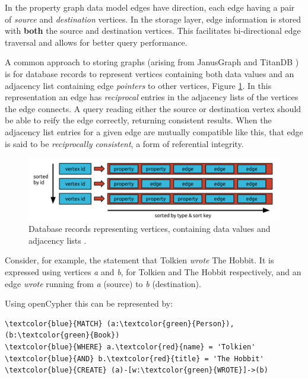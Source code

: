 \documentclass[sigplan,10pt]{acmart}
\begin{document}
In the property graph data model edges have direction, each edge having a pair of \emph{source} and \emph{destination} vertices. In the storage layer, edge information is stored with \textbf{both} the source and destination vertices. This facilitates bi-directional edge traversal and allows for better query performance.

A common approach to storing graphs (arising from JanusGraph \cite{janusgraph} and TitanDB \cite{TitanDB}) is for database records to represent vertices containing both data values and an adjacency list containing edge \emph{pointers} to other vertices, Figure \ref{adj-list}. In this representation an edge has \emph{reciprocal} entries in the adjacency lists of the vertices the edge connects. A query reading either the source or destination vertex should be able to reify the edge correctly, returning consistent results. When the adjacency list entries for a given edge are mutually compatible like this, that edge is said to be \emph{reciprocally consistent}, a form of referential integrity.

\begin{figure}[ht]
  \centering
  \includegraphics[width=\linewidth]{./images/janusgraph-adj-list}
  \caption{Database records representing vertices, containing data values and adjacency lists \cite{janusgraph}.}
  \label{adj-list}
\end{figure}

Consider, for example, the statement that Tolkien \textit{wrote} The Hobbit. It is expressed using vertices \emph{a} and \emph{b}, for Tolkien and The Hobbit respectively, and an edge \textit{wrote} running from \emph{a} (source) to \emph{b} (destination).

Using openCypher \cite{openCypher} this can be represented by:
\begin{Verbatim}[commandchars=\\\{\},fontsize=\small,xleftmargin=.2in]
\textcolor{blue}{MATCH} (a:\textcolor{green}{Person}), (b:\textcolor{green}{Book})
\textcolor{blue}{WHERE} a.\textcolor{red}{name} = 'Tolkien' \textcolor{blue}{AND} b.\textcolor{red}{title} = 'The Hobbit'
\textcolor{blue}{CREATE} (a)-[w:\textcolor{green}{WROTE}]->(b)
\end{Verbatim}
\end{document}
